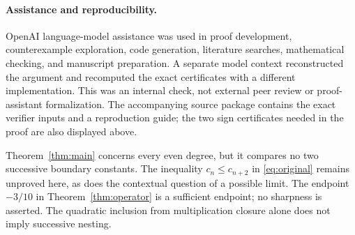 \documentclass[11pt]{article}
\theoremstyle{remark}
\begin{document}
\paragraph{Assistance and reproducibility.}
OpenAI language-model assistance was used in proof development,
counterexample exploration, code generation, literature searches,
mathematical checking, and manuscript preparation. A separate model
context reconstructed the argument and recomputed the exact certificates
with a different implementation. This was an internal check, not external
peer review or proof-assistant formalization. The accompanying source
package contains the exact verifier inputs and a reproduction guide;
the two sign certificates needed in the proof are also displayed above.

Theorem~\ref{thm:main} concerns every even degree, but it compares no two
successive boundary constants. The inequality $c_n\le c_{n+2}$ in
\eqref{eq:original} remains unproved here, as does the contextual question
of a possible limit. The endpoint $-3/10$ in
Theorem~\ref{thm:operator} is a sufficient endpoint; no sharpness is
asserted. The quadratic inclusion from multiplication closure alone does
not imply successive nesting.


\small

\end{document}
